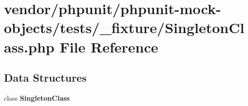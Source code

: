 \section{vendor/phpunit/phpunit-\/mock-\/objects/tests/\+\_\+fixture/\+Singleton\+Class.php File Reference}
\label{_singleton_class_8php}
\subsection*{Data Structures}
\begin{DoxyCompactItemize}
\item 
class {\bf Singleton\+Class}
\end{DoxyCompactItemize}
